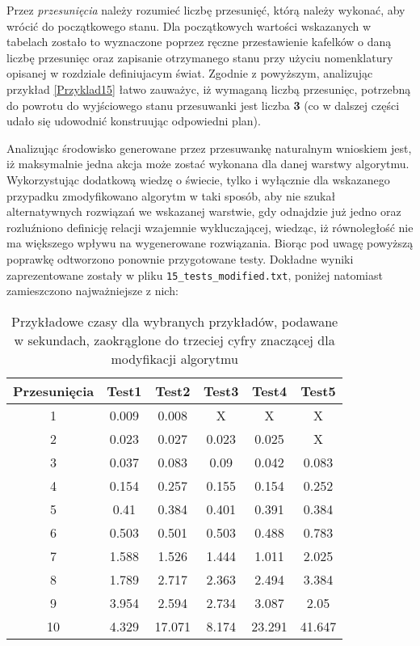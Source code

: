     Przez \textit{przesunięcia} należy rozumieć liczbę przesunięć, którą należy wykonać, aby wrócić do początkowego stanu. Dla początkowych wartości 
    wskazanych w tabelach zostało to wyznaczone poprzez ręczne przestawienie kafelków o daną liczbę przesunięc oraz zapisanie otrzymanego stanu 
    przy użyciu nomenklatury opisanej w rozdziale definiujacym świat. Zgodnie z powyższym, analizując przykład \ref{Przyklad15} łatwo zauważyc, 
    iż wymaganą liczbą przesunięc, potrzebną do powrotu do wyjściowego stanu przesuwanki jest liczba \textbf{3} (co w dalszej części udało się 
    udowodnić konstruując odpowiedni plan).

    Analizując środowisko generowane przez przesuwankę naturalnym wnioskiem jest, iż maksymalnie jedna akcja może zostać wykonana dla danej 
    warstwy algorytmu. Wykorzystując dodatkową wiedzę o świecie, tylko i wyłącznie dla wskazanego przypadku zmodyfikowano algorytm w taki sposób,
    aby nie szukał alternatywnych rozwiązań we wskazanej warstwie, gdy odnajdzie już jedno oraz rozluźniono definicję relacji wzajemnie wykluczającej,
    wiedząc, iż równoległość nie ma większego wpływu na wygenerowane rozwiązania. Biorąc pod uwagę powyższą poprawkę odtworzono ponownie przygotowane
    testy. Dokładne wyniki zaprezentowane zostały w pliku \texttt{15\_tests\_modified.txt}, poniżej natomiast zamieszczono najważniejsze z nich:
    \begin{table}[H]
        \centering
         \begin{tabular}{||c | c | c | c | c | c |} 
         \hline
         Przesunięcia & Test1 & Test2 & Test3 & Test4 & Test5 \\ [0.5ex] 
         \hline\hline
         1 & 0.009 & 0.008 & X & X & X \\ 
         \hline
         2 & 0.023 & 0.027 & 0.023 & 0.025 & X \\
         \hline
         3 & 0.037  & 0.083 & 0.09  & 0.042 & 0.083\\
         \hline
         4 & 0.154 & 0.257 & 0.155 & 0.154 & 0.252\\
         \hline
         5 & 0.41 & 0.384 & 0.401 & 0.391 & 0.384 \\
         \hline
         6 & 0.503 & 0.501 & 0.503 & 0.488 & 0.783 \\ 
         \hline
         7 & 1.588 & 1.526 & 1.444 & 1.011 & 2.025\\
         \hline
         8 & 1.789 & 2.717 & 2.363 & 2.494 & 3.384 \\
         \hline
         9 & 3.954 & 2.594 & 2.734 & 3.087 & 2.05 \\
         \hline
         10 & 4.329 & 17.071 & 8.174 & 23.291 & 41.647 \\ [1ex]
         \hline
         \end{tabular}
         \caption{Przykładowe czasy dla wybranych przykładów, podawane w sekundach, zaokrąglone do trzeciej cyfry znaczącej dla modyfikacji algorytmu}
    \end{table}
